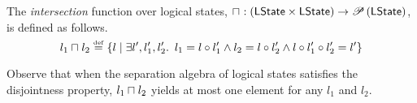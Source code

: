 %
%
%
%
%
%
%
\begin{definition}[Intersection]
The \emph{intersection} function over logical states,
$
\sqcap_{} : \left(\textsf{LState} \times \textsf{LState} \right) \rightarrow \mathscr{P}\left(\textsf{LState} \right)
$, is defined as follows.
%
\[
	l_1 \sqcap_{} l_2 \mathrel{\stackrel{\smash{\scriptscriptstyle{\mathrm{def}}}}{=}} 
	\left\{ 
		l  \mid
		\exists l', l_1', l_2'.\,\ l_1 = l \circ l_1' \land l_2 = l \circ l_2' \land l \circ l_1' \circ l_2' = l'
	\right\}
\]
%
%
\end{definition}
%
Observe that when the separation algebra of logical states satisfies the disjointness property, $l_1\sqcap_{} l_2$ yields at most one element for any $l_1$ and $l_2$.

